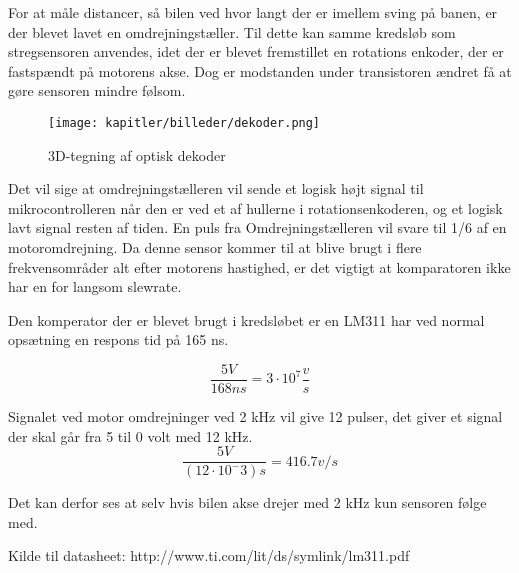 For at måle distancer, så bilen ved hvor langt der er imellem sving på banen, er der blevet lavet en omdrejningstæller. Til dette kan samme kredsløb som stregsensoren anvendes, idet der er blevet fremstillet en rotations enkoder, der er fastspændt på motorens akse. Dog er modstanden under transistoren ændret få at gøre sensoren mindre følsom.


\begin{figure}[ht]
    \centering
    \texttt{[image: kapitler/billeder/dekoder.png]}
    \caption{3D-tegning af optisk dekoder}
    \label{fig:dekoder}
\end{figure}


Det vil sige at omdrejningstælleren vil sende et logisk højt signal til mikrocontrolleren når den er ved et af hullerne i  rotationsenkoderen, og et logisk lavt signal resten af tiden. En puls fra Omdrejningstælleren vil svare til 1/6 af en motoromdrejning.
Da denne sensor kommer til at blive brugt i flere frekvensområder alt efter motorens hastighed, er det vigtigt at komparatoren ikke har en for langsom slewrate.

Den komperator der er blevet brugt i kredsløbet er en LM311 har ved normal opsætning en respons tid på 165 ns.

\begin{equation}
\frac{5 V}{168 ns} = 3 \cdot 10^7 \frac{v}{s}
\end{equation}

Signalet ved motor omdrejninger ved 2 kHz vil give 12 pulser, det giver et signal der skal går fra 5 til 0 volt med 12 kHz.
\begin{equation}
\frac{5 V}{(12 \cdot 10^-3)s} = 416.7 v/s
\end{equation}

Det kan derfor ses at selv hvis bilen akse drejer med 2 kHz kun sensoren følge med.


Kilde til datasheet: http://www.ti.com/lit/ds/symlink/lm311.pdf
